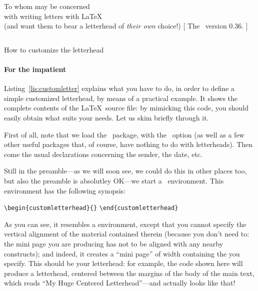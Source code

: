\begin{letterhead}{
	To whom may be concerned\\
	with writing letters with \LaTeX\\
	(and want them to bear a letterhead
	of \emph{their own} choice!)
}[
	The \Bundle\ version 0.36.
]
\begin{listing}[p]
\begin{verbatim}
\end{verbatim}
	\caption{How to customize the letterhead}
	\label{lis:customletter}
	\cleanbotp
\end{listing}



\paragraph{For the impatient}
\label{P:LetterHeadImpatient}

Listing~\ref{lis:customletter} explains what you have to do, in order to define
a simple customized letterhead, by means of a practical example.  It shows the
complete contents of the \LaTeX\ source file: by mimicking this code, you should
easily obtain what suits your needs.  Let us skim briefly through it.

First of all, note that we load the \cdpa\ package, with the \oclh\ option (as
well as a few other useful packages that, of course, have nothing to do with
letterheads).  Then come the usual declarations concerning the sender, the date,
etc.

Still in the preamble---as we will soon see, we could do this in other places
too, but also the preamble is absolutley OK\@---we start a \eclh\ environment.
This environment has the following synopsis:
%
\begin{flushleft}
	\verb|\begin{customletterhead}{|\verb|}|\quad
	\quad
	\verb|\end{customletterhead}|
\end{flushleft}
%
As you can see, it resembles a  environment, except that you
cannot specify the vertical alignment of the material contained therein (because
you don't need to: the mini page you are producing has not to be aligned with
any nearby constructs); and indeed, it creates a ``mini page'' of width
 containing the  you specify.  This  should be
your letterhead: for example, the code shown here will produce a letterhead,
centered between the margins of the body of the main text, which reads ``My Huge
Centered Letterhead''---and actually looks like that!~\facesmile


\end{letterhead}
